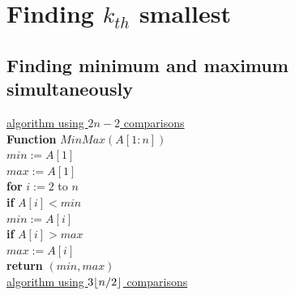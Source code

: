 \documentclass[11pt]{article}
\DeclarePairedDelimiter\floor{\lfloor}{\rfloor}
\begin{document}
\section{Finding $k_{th}$ smallest}
\subsection{Finding minimum and maximum simultaneously}

\underline{algorithm using $2n-2$ comparisons}\\

\textbf{Function} $MinMax(A[1:n])$\\
\-\hspace{3em} $min := A[1]$\\
\-\hspace{3em} $max := A[1]$\\
\-\hspace{3em} \textbf{for} $i := 2$ to $n$\\
\-\hspace{5em} \textbf{if} $A[i] < min$\\
\-\hspace{7em} $min := A[i]$\\
\-\hspace{5em} \textbf{if} $A[i] > max$\\
\-\hspace{7em} $max := A[i]$\\
\-\hspace{3em} \textbf{return} $(min,max)$\\

\underline{algorithm using $3\floor{n/2}$ comparisons}\\
\end{document}
